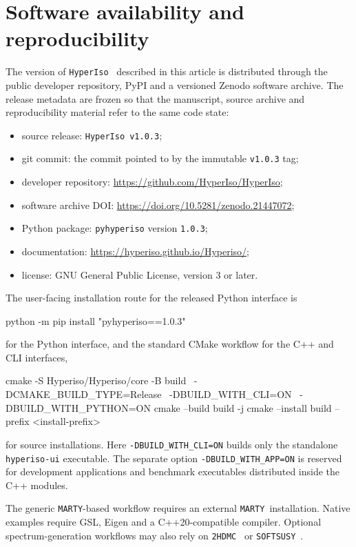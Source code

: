 \documentclass[preprint,11pt]{elsarticle}
\newcommand{\hi}{\texttt{HyperIso}}
\newcommand{\mty}{\texttt{MARTY}}
\begin{document}
\section{Software availability and reproducibility}\label{sec:software_availability}

The version of \hi~ described in this article is distributed through the public developer repository, PyPI and a versioned Zenodo software archive. The release metadata are frozen so that the manuscript, source archive and reproducibility material refer to the same code state:
\begin{itemize}
    \item source release: \texttt{HyperIso v1.0.3};
    \item git commit: the commit pointed to by the immutable \texttt{v1.0.3} tag;
    \item developer repository: \url{https://github.com/HyperIso/HyperIso};
    \item software archive DOI: \url{https://doi.org/10.5281/zenodo.21447072};
    \item Python package: \texttt{pyhyperiso} version \texttt{1.0.3};
    \item documentation: \url{https://hyperiso.github.io/Hyperiso/};
    \item license: GNU General Public License, version 3 or later.
\end{itemize}

The user-facing installation route for the released Python interface is
\begin{terminal}
python -m pip install "pyhyperiso==1.0.3"
\end{terminal}
for the Python interface, and the standard CMake workflow for the C++ and CLI interfaces,
\begin{terminal}
cmake -S Hyperiso/Hyperiso/core -B build \
  -DCMAKE_BUILD_TYPE=Release \
  -DBUILD_WITH_CLI=ON \
  -DBUILD_WITH_PYTHON=ON
cmake --build build -j
cmake --install build --prefix <install-prefix>
\end{terminal}
for source installations.  Here \texttt{-DBUILD\_WITH\_CLI=ON} builds only the standalone \texttt{hyperiso-ui} executable.  The separate option \texttt{-DBUILD\_WITH\_APP=ON} is reserved for development applications and benchmark executables distributed inside the C++ modules.

The generic \mty-based workflow requires an external \mty~installation. Native examples require GSL, Eigen and a C++20-compatible compiler.  Optional spectrum-generation workflows may also rely on \texttt{2HDMC}~\cite{Eriksson:2009ws} or \texttt{SOFTSUSY}~\cite{Allanach:2001kg}.
\end{document}
